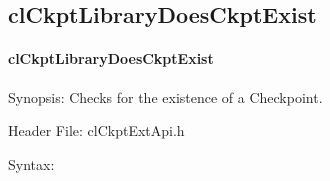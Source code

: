 \begin{flushleft}
\subsection{clCkptLibraryDoesCkptExist}
\hypertarget{pageckpt209}{}\paragraph{cl\-Ckpt\-Library\-Does\-Ckpt\-Exist}\label{pageckpt209}
\begin{Desc}
\item[Synopsis:]Checks for the existence of a Checkpoint.\end{Desc}
\begin{Desc}
\item[Header File:]clCkptExtApi.h\end{Desc}
\begin{Desc}
\item[Syntax:]


\end{Desc}
\end{flushleft}
